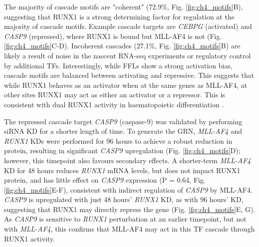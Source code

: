 The majority of cascade motifs are "coherent" (72.9\%, Fig. \ref{fig:ch4_motifs}B), suggesting that RUNX1 is a strong determining factor for regulation at the majority of cascade motifs. Example cascade targets are \textit{CEBPG} (activated) and \textit{CASP9} (repressed), where RUNX1 is bound but MLL-AF4 is not (Fig. \ref{fig:ch4_motifs}C-D). Incoherent cascades (27.1\%, Fig. \ref{fig:ch4_motifs}B) are likely a result of noise in the nascent RNA-seq experiments or regulatory control by additional TFs. Interestingly, while FFLs show a strong activation bias, cascade motifs are balanced between activating and repressive. This suggests that while RUNX1 behaves as an activator when at the same genes as MLL-AF4, at other sites RUNX1 may act as either an activator or a repressor. This is consistent with dual RUNX1 activity in haematopoietic differentiation \citep{kuvardina_runx1_2015, lutterbach_role_2000, canon_vivo_2003}.

The repressed cascade target \textit{CASP9} (caspase-9) was validated by performing siRNA KD for a shorter length of time. To generate the GRN, \textit{MLL-AF4} and \textit{RUNX1} KDs were performed for 96 hours to achieve a robust reduction in protein, resulting in significant \textit{CASP9} upregulation (Fig. \ref{fig:ch4_motifs}D); however, this timepoint also favours secondary effects. A shorter-term \textit{MLL-AF4} KD for 48 hours reduces \textit{RUNX1} mRNA levels, but does not impact RUNX1 protein, and has little effect on \textit{CASP9} expression (P = 0.64, Fig. \ref{fig:ch4_motifs}E-F), consistent with indirect regulation of \textit{CASP9} by MLL-AF4. \textit{CASP9} is upregulated with just 48 hours' \textit{RUNX1} KD, as with 96 hours' KD, suggesting that RUNX1 may directly repress the gene (Fig. \ref{fig:ch4_motifs}E, G). As \textit{CASP9} is sensitive to \textit{RUNX1} perturbation at an earlier timepoint, but not with \textit{MLL-AF4}, this confirms that MLL-AF4 may act in this TF cascade through RUNX1 activity.

